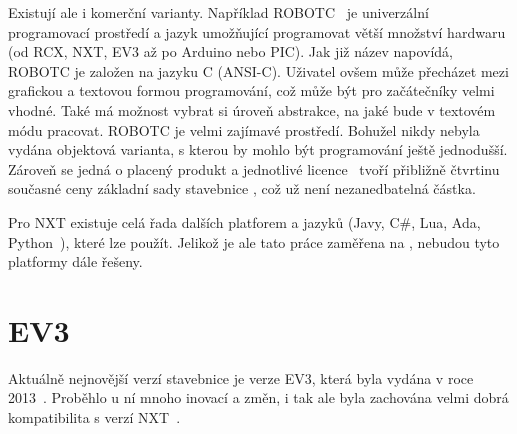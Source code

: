 Existují ale i komerční varianty. 
Například ROBOTC~\cite{legoProgramingPlatform_ROBOTC} je univerzální programovací prostředí a jazyk umožňující programovat větší množství hardwaru (od \legoM{ }RCX, NXT, EV3 až po Arduino nebo PIC). 
Jak již název napovídá, ROBOTC je založen na jazyku C (ANSI-C).
Uživatel ovšem může přecházet mezi grafickou a textovou formou programování, což může být pro začátečníky velmi vhodné.
Také má možnost vybrat si úroveň abstrakce, na jaké bude v textovém módu pracovat.  
% 
% 
%
%
ROBOTC je velmi zajímavé prostředí. Bohužel nikdy nebyla vydána objektová varianta, s kterou by mohlo být programování ještě jednodušší. 
Zároveň se jedná o placený produkt a jednotlivé licence~\cite{legoProgramingPlatform_ROBOTC-price} tvoří přibližně čtvrtinu současné ceny základní sady stavebnice \legoEV{~}\cite{lego_eduxeEshop_CoreSet}, což už není nezanedbatelná částka.

Pro NXT existuje celá řada dalších platforem a jazyků (Javy, C\#, Lua, Ada, Python~\cite{legoMindstormsNXT_Programming}), které lze použít. 
Jelikož je ale tato práce zaměřena na \legoEV{ }, nebudou tyto platformy dále řešeny. 
% 
% 
%
%


\section{\legoM{ }EV3}

Aktuálně nejnovější verzí stavebnice \legoM{ }je verze EV3, která byla vydána v roce 2013~\cite{lego_mindstormsHistory}. 
Proběhlo u ní mnoho inovací a změn, i tak ale byla zachována velmi dobrá kompatibilita s verzí NXT~\cite{legoRobotSquare_EV3-and-NXT-compatibility}.
% 
% 
% 
%
%
%
%

